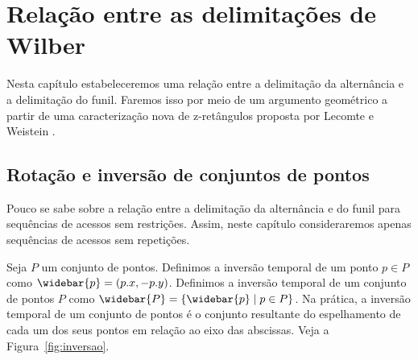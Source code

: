
\chapter{Relação entre as delimitações de Wilber}
\label{cap:relacao-wilber}

Nesta capítulo estabeleceremos uma relação entre a delimitação da alternância e a delimitação do funil. Faremos isso por meio de um argumento geométrico a partir de uma caracterização nova de z-retângulos proposta por Lecomte e Weistein \cite{new_boundaries}.




\section{Rotação e inversão de conjuntos de pontos}
Pouco se sabe sobre a relação entre a delimitação da alternância e do funil para sequências de acessos sem restrições. Assim, neste capítulo consideraremos apenas sequências de acessos sem repetições.

Seja $P$ um conjunto de pontos. Definimos a inversão temporal de um ponto $p \in P$ como $\widebar{p} = (p.x,-p.y)$. Definimos a inversão temporal de um conjunto de pontos $P$ como $\widebar{P} = \{\widebar{p} \mid p \in P\}$. Na prática, a inversão temporal de um conjunto de pontos é o conjunto resultante do espelhamento de cada um dos seus pontos em relação ao eixo das abscissas. Veja a Figura~\ref{fig:inversao}.


